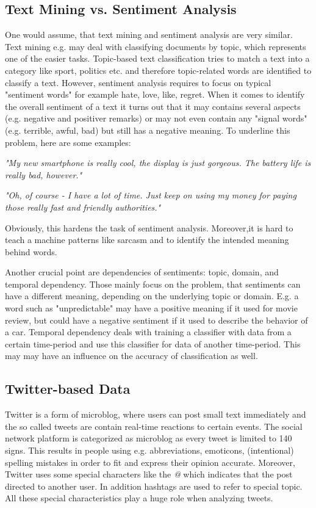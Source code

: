 \documentclass{acm_proc_article-sp}
\begin{document}
\subsection{Text Mining vs. Sentiment Analysis}
One would assume, that text mining and sentiment analysis are very similar. Text mining e.g. may deal with classifying documents by topic, which represents one of the easier tasks. Topic-based text classification tries to match a text into a category like sport, politics etc. and therefore topic-related words are identified to classify a text. However, sentiment analysis requires to focus on typical "sentiment words" for example hate, love, like, regret.
When it comes to identify the overall sentiment of a text it turns out that it may contains several aspects (e.g. negative and positiver remarks) or may not even contain any "signal words" (e.g. terrible, awful, bad) but still has a negative meaning.
To underline this problem, here are some examples:

\textit{"My new smartphone is really cool, the display is just gorgeous. The battery life is really bad, however."}

\textsl{"Oh, of course - I have a lot of time. Just keep on using my money for paying those really fast and friendly authorities."}

Obviously, this hardens the task of sentiment analysis. Moreover,it is hard to teach a machine patterns like sarcasm and to identify the intended meaning behind words.
\cite{liu2010sentimentanalysis,pang2008opinion}


Another crucial point are dependencies of sentiments: topic, domain, and temporal dependency. Those mainly focus on the problem, that sentiments can have a different meaning, depending on the underlying topic or domain. E.g. a word such as "unpredictable" may have a positive meaning if it used for movie review, but could have a negative sentiment if it used to describe the behavior of a car. Temporal dependency deals with training a classifier with data from a certain time-period and use this classifier for data of another time-period. This may may have an influence on the accuracy of classification as well. \cite{read2005using}

\subsection{Twitter-based Data}
Twitter is a form of microblog, where users can post small text immediately and the so called tweets are contain real-time reactions to certain events. The social network platform is categorized as microblog as every tweet is limited to 140 signs. This results in people using e.g. abbreviations, emoticons, (intentional) spelling mistakes in order to fit and express their opinion accurate. Moreover, Twitter uses some special characters like the \emph{@} which indicates that the post directed to another user. In addition hashtags are used to refer to special topic. All these special characteristics play a huge role when analyzing tweets. \cite{agarwal2011sentiment, read2005using}
\end{document}
